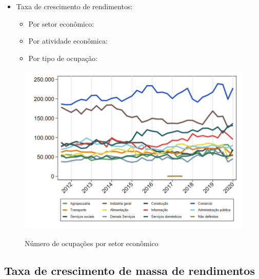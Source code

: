 \documentclass[8pt]{beamer}
\begin{document}
\begin{frame}[label=indice_principal_amz_manaus]{}
\begin{itemize}
\item{Taxa de crescimento de rendimentos:
	\begin{itemize}
	\item{Por setor econômico: \hyperlink{amzmanausrkngtxrendaporsetor}{}}
	\item{Por atividade econômica: \hyperlink{amzmanausrkngtxrendaporatividade}{}}
	\item{Por tipo de ocupação: \hyperlink{amzmanausrkngtxrendaporocupacao}{}}
	\end{itemize}
}
\vspace{1mm}

\end{itemize}

\end{frame}

\begin{frame}
\textit{\hyperlink{indice_principal_amz_manaus}{}}
\begin{figure}
  \centering
  \includegraphics[width=.85\linewidth]{./../analysis/output/_amz_manaus_importancia_relativa.png}
  \label{_amz_manaus_importancia_relativa}
  \caption{{Número de ocupações por setor econômico}}
\end{figure}
\end{frame}

\subsection{Taxa de crescimento de massa de rendimentos}

\begin{frame}
\textit{\hyperlink{indice_principal_amz_manaus}{}}

\end{frame}
\end{document}
